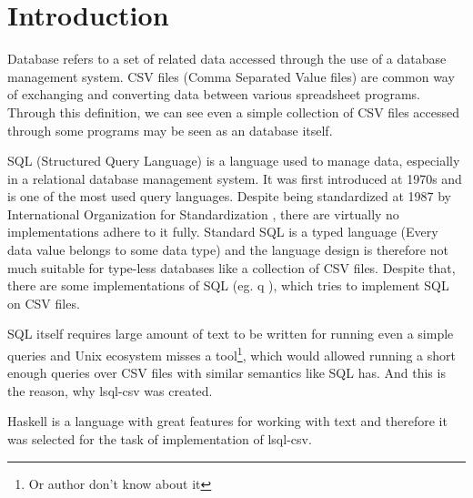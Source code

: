 \chapter*{Introduction}

Database refers to a set of related data accessed through the use of a database management system. \cite{enwiki-database} 
CSV files (Comma Separated Value files) are common way of exchanging and converting data between various spreadsheet programs. \cite{rfc4180} 
Through this definition, we can see even a simple collection of CSV files accessed through some programs may be seen as an database itself.


SQL (Structured Query Language) is a language used to manage data, especially in a relational database management system. \cite{enwiki-sql} 
It was first introduced at 1970s \cite{enwiki-sql} and is one of the most used query languages. 
Despite being standardized at 1987 by International Organization for Standardization \cite{ISO9075-1987}, 
there are virtually no implementations adhere to it fully. \cite{enwiki-sql}
Standard SQL is a typed language (Every data value belongs to some data type) \cite{ISO9075-2023} and the language
design is therefore not much suitable for type-less databases like a collection of CSV files.
Despite that, there are some implementations of SQL (eg. q \cite{q}), which tries to implement SQL on CSV files.

SQL itself requires large amount of text to be written for running even a simple queries and Unix ecosystem misses a tool\footnote{Or author don't know about it}, 
which would allowed running a short enough queries over CSV files with similar semantics like SQL has. And this is the reason, why lsql-csv was created.

Haskell is a language with great features for working with text \cite{practical-haskell} and therefore it was selected for the task of implementation of lsql-csv.

